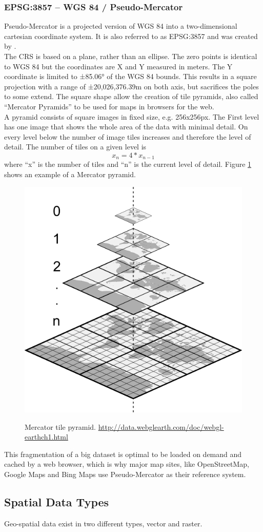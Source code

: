 \subsubsection{EPSG:3857 -- WGS 84 / Pseudo-Mercator}
Pseudo-Mercator is a projected version of WGS 84 into a two-dimensional cartesian coordinate system. It is also referred to as EPSG:3857 and was created by \cite{Grafarend1995}.\\
The CRS is based on a plane, rather than an ellipse. The zero points is identical to WGS 84 but the coordinates are X and Y measured in meters. The Y coordinate is limited to ±85.06° of the WGS 84 bounds. This results in a square projection with a range of ±20,026,376.39m on both axis, but sacrifices the poles to some extend. The square shape allow the creation of tile pyramids, also called \enquote{Mercator Pyramids} to be used for maps in browsers for the web.\\
A pyramid consists of square images in fixed size, e.g. 256x256px. The First level has one image that shows the whole area of the data with minimal detail. On every level below the number of image tiles increases and therefore the level of detail. The number of tiles on a given level is
$$x_n= 4* x_{n-1}$$ 
where \enquote{x} is the number of tiles and \enquote{n} is the current level of detail. Figure \ref{img:mercator-pyramid} shows an example of a Mercator pyramid.
\begin{figure}[H]
	\centering
	\includegraphics[width=0.4\columnwidth]{res/mercator-pyramid}\\
	\caption[]{Mercator tile pyramid. \url{http://data.webglearth.com/doc/webgl-earthch1.html}}
	\label{img:mercator-pyramid}
\end{figure}
This fragmentation of a big dataset is optimal to be loaded on demand and cached by a web browser, which is why major map sites, like OpenStreetMap, Google Maps and Bing Maps use Pseudo-Mercator as their reference system.


\subsection{Spatial Data Types}
Geo-spatial data exist in two different types, vector and raster. 

